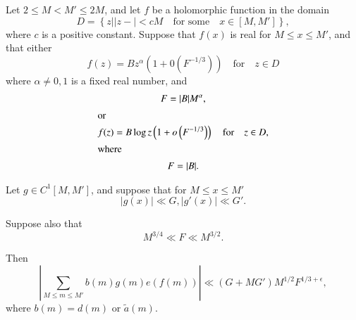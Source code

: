 \begin{thm}\label{chap4:thm4.6}
Let $2\leq M<M'\leq 2M$, and let $f$ be a holomorphic function in the domain
\begin{equation}\label{chap4:eq4.3.2}
D=\left\{z\left| |z-|<cM\quad\text{for some}\quad x\in [M,M']\right.\right\},
\end{equation}
where $c$ is a positive constant. Suppose that $f(x)$ is real for $M\leq x\leq M'$, and that either
\begin{equation}\label{chap4:eq4.3.3}
f(z)=Bz^\alpha\left(1+0\left(F^{-1/3}\right)\right)\quad\text{for}\quad z\in D 
\end{equation}
where $\alpha\neq 0,1$ is a fixed real number, and
\begin{gather}
F=|B|M^\alpha,\label{chap4:eq4.3.4}\\
\intertext{or}
f(z)=B\log z\left(1+o\left(F^{-1/3}\right)\right)\quad\text{for}\quad
z\in D,\label{chap4:eq4.3.5} \\
\intertext{where}
F=|B|.\label{chap4:eq4.3.6}
\end{gather}

Let $g\in C^1[M,M']$, and suppose that for $M\leq x\leq M'$
\begin{equation}\label{chap4:eq4.3.7}
|g(x)|\ll G,|g'(x)|\ll G'.
\end{equation}

Suppose also that 
\begin{equation}\label{chap4:eq4.3.8}
M^{3/4}\ll F \ll M^{3/2}.
\end{equation}

Then
\begin{equation}\label{chap4:eq4.3.9}
\left|\sum\limits_{M\leq m\leq M'}b(m)g(m)e(f(m))\right|\ll
(G+MG')M^{1/2} F^{1/3+\epsilon}, 
\end{equation}
where $b(m)=d(m)$ or $\tilde{a}(m)$.
\end{thm}

